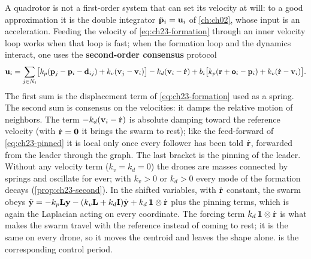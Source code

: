 A quadrotor is not a first-order system that can set its velocity at will: to
a good approximation it is the double integrator $\ddot{\mathbf{p}}_i = \mathbf{u}_i$ of
\cref{ch:ch02}, whose input is an acceleration. Feeding the velocity of
\cref{eq:ch23-formation} through an inner velocity loop works when that loop
is fast; when the formation loop and the dynamics interact, one uses the
\textbf{second-order consensus}
protocol \cite{ren2008distributed,olfatisaber2007consensus}
\begin{equation}
  \mathbf{u}_i = \sum_{j \in N_i} \bigl[ k_p (\mathbf{p}_j - \mathbf{p}_i - \mathbf{d}_{ij})
  + k_v (\mathbf{v}_j - \mathbf{v}_i) \bigr] - k_d (\mathbf{v}_i - \dot{\mathbf{r}})
  + b_i \bigl[ k_p (\mathbf{r} + \mathbf{o}_i - \mathbf{p}_i) + k_v (\dot{\mathbf{r}} - \mathbf{v}_i) \bigr].
  \label{eq:ch23-second}
\end{equation}
The first sum is the displacement term of \cref{eq:ch23-formation} used as a
spring. The second sum is consensus on the velocities: it damps the relative
motion of neighbors. The term $-k_d(\mathbf{v}_i - \dot{\mathbf{r}})$ is absolute
damping toward the reference velocity (with $\dot{\mathbf{r}} = \mathbf{0}$ it
brings the swarm to rest); like the feed-forward of \cref{eq:ch23-pinned} it is
local only once every follower has been told $\dot{\mathbf{r}}$, forwarded from
the leader through the graph. The last bracket is the pinning of the leader.
Without any velocity term ($k_v = k_d = 0$) the drones are masses connected by
springs and oscillate for ever; with $k_v > 0$ or $k_d > 0$ every mode of the
formation decays (\cref{prop:ch23-second}). In the shifted variables, with
$\dot{\mathbf{r}}$ constant, the swarm obeys $\ddot{\mathbf{y}} =
-k_p\mathbf{L}\mathbf{y} - (k_v\mathbf{L} + k_d\mathbf{I})\dot{\mathbf{y}}
+ k_d\,\mathbf{1}\otimes\dot{\mathbf{r}}$ plus the pinning terms, which is again
the Laplacian acting on every coordinate. The forcing term
$k_d\,\mathbf{1}\otimes\dot{\mathbf{r}}$ is what makes the swarm travel with the
reference instead of coming to rest; it is the same on every drone, so it
moves the centroid and leaves the shape alone.  is the corresponding
control period.

